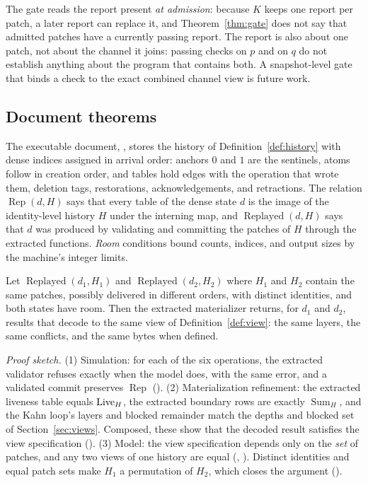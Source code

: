 The gate reads the report present \emph{at admission}: because $K$ keeps one report per patch, a later report can replace it, and Theorem~\ref{thm:gate} does not say that admitted patches have a currently passing report. The report is also about one patch, not about the channel it joins: passing checks on $p$ and on $q$ do not establish anything about the program that contains both. A snapshot-level gate that binds a check to the exact combined channel view is future work.

\subsection{Document theorems}\label{sec:convergence}
The executable document, , stores the history of Definition~\ref{def:history} with dense indices assigned in arrival order: anchors $0$ and $1$ are the sentinels, atoms follow in creation order, and tables hold edges with the operation that wrote them, deletion tags, restorations, acknowledgements, and retractions. The relation $\operatorname{Rep}(d,H)$ says that every table of the dense state $d$ is the image of the identity-level history $H$ under the interning map, and $\operatorname{Replayed}(d,H)$ says that $d$ was produced by validating and committing the patches of $H$ through the extracted functions. \emph{Room} conditions bound counts, indices, and output sizes by the machine's integer limits.

\begin{claim}\label{thm:converge}
Let $\operatorname{Replayed}(d_1,H_1)$ and $\operatorname{Replayed}(d_2,H_2)$ where $H_1$ and $H_2$ contain the same patches, possibly delivered in different orders, with distinct identities, and both states have room. Then the extracted materializer returns, for $d_1$ and $d_2$, results that decode to the same view of Definition~\ref{def:view}: the same layers, the same conflicts, and the same bytes when defined.
\end{claim}
\noindent\emph{Proof sketch.} (1) Simulation: for each of the six operations, the extracted validator refuses exactly when the model does, with the same error, and a validated commit preserves $\operatorname{Rep}$ (). (2) Materialization refinement: the extracted liveness table equals $\operatorname{Live}_H$, the extracted boundary rows are exactly $\operatorname{Sum}_H$, and the Kahn loop's layers and blocked remainder match the depths and blocked set of Section~\ref{sec:views}. Composed, these show that the decoded result satisfies the view specification (). (3) Model: the view specification depends only on the \emph{set} of patches, and any two views of one history are equal (, ). Distinct identities and equal patch sets make $H_1$ a permutation of $H_2$, which closes the argument ().

